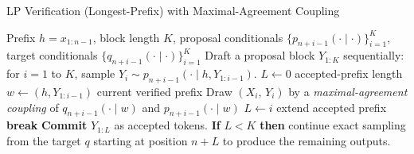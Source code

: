 \begin{algorithm}[t]
\caption{LP Verification (Longest-Prefix) with Maximal-Agreement Coupling}
\label{alg:lp-verification}
\begin{algorithmic}[1]
\Require Prefix $h=x_{1:n-1}$, block length $K$, proposal conditionals $\{p_{n+i-1}(\cdot\mid \cdot)\}_{i=1}^K$, target conditionals $\{q_{n+i-1}(\cdot\mid \cdot)\}_{i=1}^K$
\State Draft a proposal block $Y_{1:K}$ sequentially: for $i=1$ to $K$, sample $Y_i\sim p_{n+i-1}(\cdot\mid h, Y_{1:i-1})$.
\State $L\gets 0$ \Comment accepted-prefix length
  \State $w\gets (h, Y_{1:i-1})$ \Comment current verified prefix
  \State Draw $(X_i,\,Y_i)$ by a \emph{maximal-agreement coupling} of $q_{n+i-1}(\cdot\mid w)$ and $p_{n+i-1}(\cdot\mid w)$
     \State $L\gets i$ \Comment extend accepted prefix
  \Else
     \State \textbf{break}
  \EndIf
\EndFor
\State \textbf{Commit} $Y_{1:L}$ as accepted tokens.
\State \textbf{If} $L<K$ \textbf{then} continue exact sampling from the target $q$ starting at position $n+L$ to produce the remaining outputs.
\end{algorithmic}
\end{algorithm}

